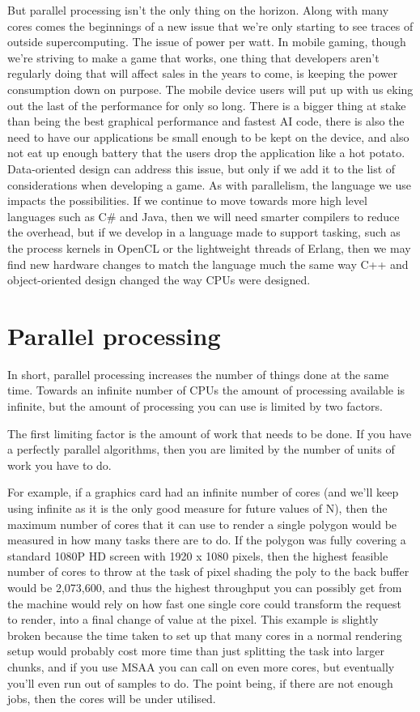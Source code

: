 But parallel processing isn't the only thing on the horizon. Along with many
cores comes the beginnings of a new issue that we're only starting to see
traces of outside supercomputing. The issue of power per watt. In mobile
gaming, though we're striving to make a game that works, one thing that
developers aren't regularly doing that will affect sales in the years to come,
is keeping the power consumption down on purpose. The mobile device users will
put up with us eking out the last of the performance for only so long. There
is a bigger thing at stake than being the best graphical performance and
fastest AI code, there is also the need to have our applications be small
enough to be kept on the device, and also not eat up enough battery that the
users drop the application like a hot potato. Data-oriented design can address this
issue, but only if we add it to the list of considerations when developing a
game. As with parallelism, the language we use impacts the possibilities. If we
continue to move towards more high level languages such as C\# and Java, then
we will need smarter compilers to reduce the overhead, but if we develop in a
language made to support tasking, such as the process kernels in OpenCL or the
lightweight threads of Erlang, then we may find new hardware changes to match
the language much the same way C++ and object-oriented design changed the way
CPUs were designed.

\section{Parallel processing}

In short, parallel processing increases the number of things done at the same
time. Towards an infinite number of CPUs the amount of processing available is
infinite, but the amount of processing you can use is limited by two factors.

The first limiting factor is the amount of work that needs to be done. If you
have a perfectly parallel algorithms, then you are limited by the number of
units of work you have to do.

For example, if a graphics card had an infinite number of cores (and we'll keep
using infinite as it is the only good measure for future values of N), then the
maximum number of cores that it can use to render a single polygon would be
measured in how many tasks there are to do. If the polygon was fully covering a
standard 1080P HD screen with 1920 x 1080 pixels, then the highest feasible
number of cores to throw at the task of pixel shading the poly to the back
buffer would be 2,073,600, and thus the highest throughput you can possibly get
from the machine would rely on how fast one single core could transform the
request to render, into a final change of value at the pixel. This example is
slightly broken because the time taken to set up that many cores in a normal
rendering setup would probably cost more time than just splitting the task into
larger chunks, and if you use MSAA you can call on even more cores, but
eventually you'll even run out of samples to do. The point being, if there are
not enough jobs, then the cores will be under utilised.

